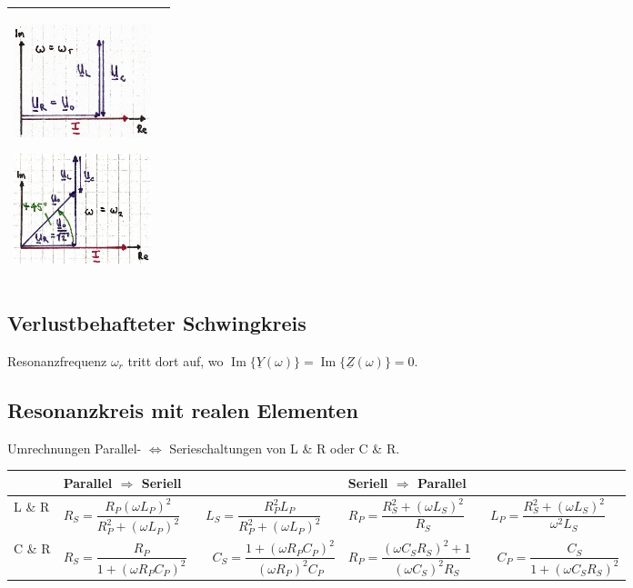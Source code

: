 \begin{tabular}{| p{4cm} | p{14.4cm}|}
\begin{minipage}{4.6cm}
    \end{minipage}
	\vline \hspace{0.1cm}
	\begin{minipage}{4.6cm}
  		\includegraphics[width=4cm]{./bilder/Zeigerdiagramm_wr.jpg}
    \end{minipage}
	\vline \hspace{0.1cm}
	\begin{minipage}{4.6cm}
 		\includegraphics[width=4cm]{./bilder/Zeigerdiagramm_w2.jpg}   
    \end{minipage}\\
	\hline
\end{tabular}
\renewcommand{\arraystretch}{1}

\subsection{Verlustbehafteter Schwingkreis}
Resonanzfrequenz $\omega_r$ tritt dort auf, wo 
$\operatorname{Im} \{ \underline{Y}(\omega) \} =
\operatorname{Im}\{\underline{Z}(\omega) \} = 0$.

\subsection{Resonanzkreis mit realen Elementen}
Umrechnungen Parallel- $\Longleftrightarrow$ Serieschaltungen von L \& R oder C \& R. \\

\renewcommand{\arraystretch}{1.1}
\begin{tabular}{| p{2cm} | p{8cm} | p{8cm} |}
	\hline
		& \textbf{Parallel $\Rightarrow$ Seriell}  
		& \textbf{Seriell $\Rightarrow$ Parallel} \\
	\hline
		L \& R
		& $ R_S = \dfrac{R_P (\omega L_P)^2}{R_P^2 + (\omega L_P)^2} \qquad 
			L_S = \dfrac{R_P^2 L_P}{R_P^2 + (\omega L_P)^2}  $
		& $ R_P = \dfrac{R_S^2 + (\omega L_S)^2}{R_S} \qquad 
			L_P = \dfrac{R_S^2 + (\omega L_S)^2}{\omega^2 L_S}   $ \\
	\hline	
		C \& R
		& $ R_S = \dfrac{R_P}{1 + (\omega R_P C_P)^2} \qquad 
			C_S = \dfrac{1 + (\omega R_P C_P)^2}{(\omega R_P)^2 C_P}$
		& $ R_P = \dfrac{(\omega C_S R_S)^2 + 1}{(\omega C_S)^2 R_S} \qquad
			C_P = \dfrac{C_S}{1 + (\omega C_S R_S)^2}$\\
	\hline
\end{tabular}
\renewcommand{\arraystretch}{1}
